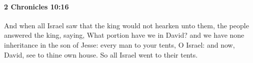 
		\paragraph{2 Chronicles 10:16} %
			\label{2CHRONICLES-10-16}

			And when all Israel saw that the king would not hearken unto them, the people answered the king, saying, What portion have we in David? and we have none inheritance in the son of Jesse: every man to your tents, O Israel: and now, David, see to thine own house. So all Israel went to their tents.


